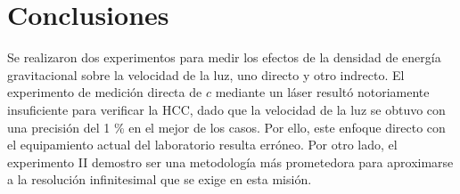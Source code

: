 \chapter*{Conclusiones}






Se realizaron dos experimentos para medir los efectos de la densidad de energía gravitacional sobre la velocidad de la luz, uno directo y otro indrecto. El experimento de medición directa de $c$ mediante un láser resultó notoriamente insuficiente para verificar la \ac{HCC}, dado que la velocidad de la luz se obtuvo con una precisión del 1 \% en el mejor de los casos. Por ello, este enfoque directo con el equipamiento actual del laboratorio resulta erróneo. Por otro lado, el experimento II demostro ser una metodología más prometedora para aproximarse a la resolución infinitesimal que se exige en esta misión. 

